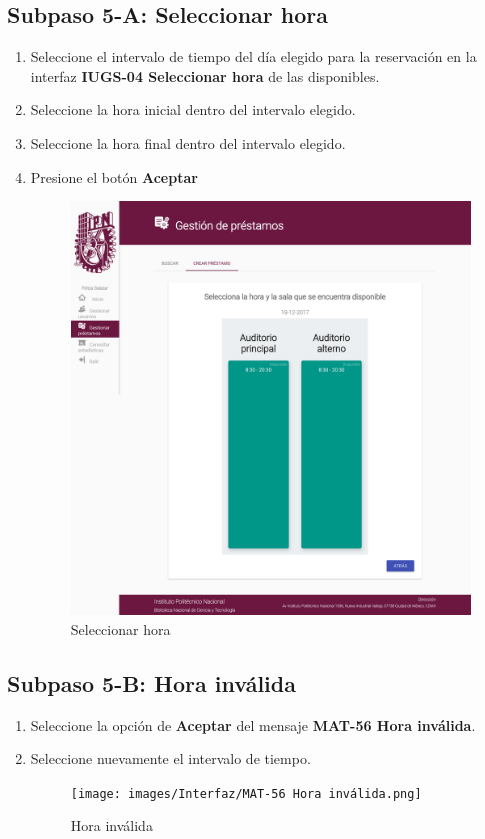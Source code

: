 \subsection{Subpaso 5-A: Seleccionar hora}
\begin{enumerate}
	\item Seleccione el intervalo de tiempo del día elegido para la reservación en la interfaz
    \textbf{IUGS-04 Seleccionar hora} de las disponibles.
\item Seleccione la hora inicial dentro del intervalo elegido.
\item Seleccione la hora final dentro del intervalo elegido.
\item Presione el botón \textbf{Aceptar}
\begin{figure}[hbtp]
	\includegraphics[scale=0.3]{images/Interfaz/IUGS-04 Seleccionar hora.png}
	\caption{Seleccionar hora}
	\end{figure}
\end{enumerate}

\subsection{Subpaso 5-B: Hora inválida}
\begin{enumerate}
	\item Seleccione la opción de \textbf{Aceptar} del mensaje
\textbf{MAT-56 Hora inválida}.
\item Seleccione nuevamente el intervalo de tiempo.
\begin{figure}[hbtp]
	\texttt{[image: images/Interfaz/MAT-56 Hora inválida.png]}
	\caption{Hora inválida}
	\end{figure}
\end{enumerate}

